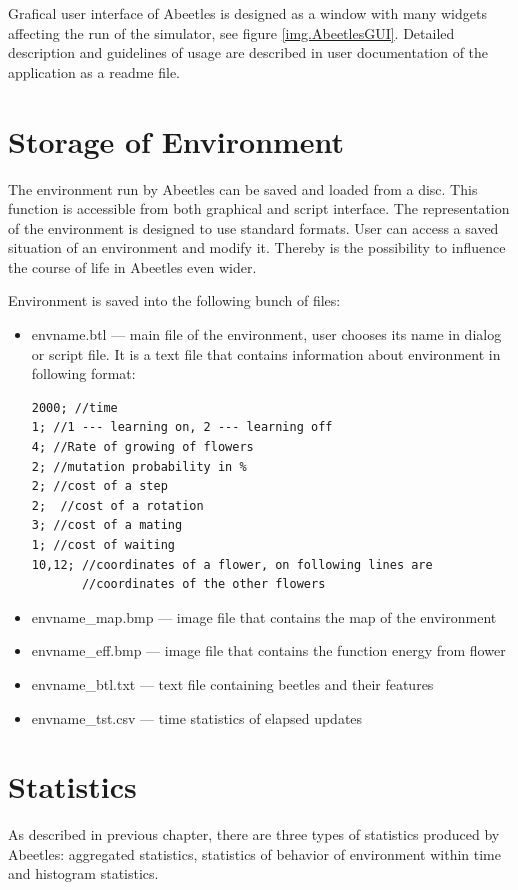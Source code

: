 \documentclass[a4paper,12pt]{report}
\begin{document}
Grafical user interface of Abeetles is designed as a window with many widgets affecting the run of the simulator, see figure \ref{img.AbeetlesGUI}. Detailed description and guidelines of usage are described in user documentation of the application as a readme file.

\section{Storage of Environment}

The environment run by Abeetles can be saved and loaded from a disc. This function is accessible from both graphical and script interface. The representation of the environment is designed to use standard formats. User can access a saved situation of an environment and modify it. Thereby is the possibility to influence the course of life in Abeetles even wider.

Environment is saved into the following bunch of files:
\begin{itemize}
\item envname.btl --- main file of the environment, user chooses its name in dialog or script file. It is a text file that contains information about environment in following format:
\begin{verbatim}
2000; //time
1; //1 --- learning on, 2 --- learning off
4; //Rate of growing of flowers
2; //mutation probability in %
2; //cost of a step
2;  //cost of a rotation
3; //cost of a mating
1; //cost of waiting
10,12; //coordinates of a flower, on following lines are 
       //coordinates of the other flowers 
\end{verbatim}
\item envname\_map.bmp --- image file that contains the map of the environment
\item envname\_eff.bmp --- image file that contains the function energy from flower 
\item envname\_btl.txt --- text file containing beetles and their features 
\item envname\_tst.csv --- time statistics of elapsed updates
\end{itemize}  

\section {Statistics}
As described in previous chapter, there are three types of statistics produced by Abeetles: aggregated statistics, statistics of behavior of environment within time and histogram statistics.
\end{document}
